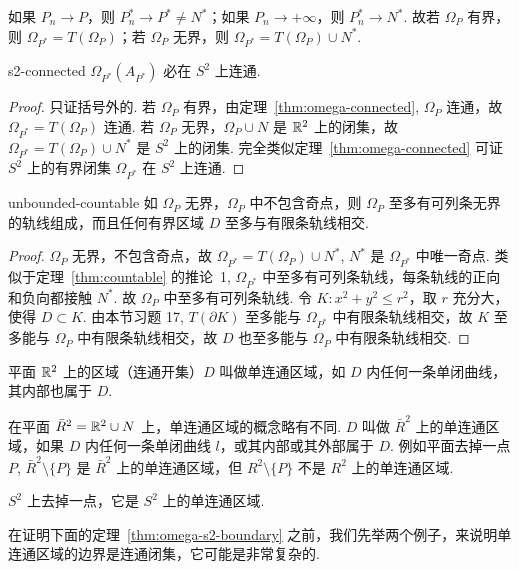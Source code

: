 如果 $P_n \to P$，则 $P_n^* \to P^* \neq N^*$；如果 $P_n \to +\infty$，则 $P_n^* \to N^*$. 故若 $\Omega_P$ 有界，则 $\Omega_{P^*} = T(\Omega_P)$；若 $\Omega_P$ 无界，则 $\Omega_{P^*} = T(\Omega_P) \cup N^*$.

\begin{theorem}{}{s2-connected}
$\Omega_{P^*}(A_{P^*})$ 必在 $S^2$ 上连通.
\end{theorem}

\begin{proof}
只证括号外的. 若 $\Omega_P$ 有界，由定理~\ref{thm:omega-connected}, $\Omega_P$ 连通，故 $\Omega_{P^*} = T(\Omega_P)$ 连通. 若 $\Omega_P$ 无界，$\Omega_P \cup N$ 是 $\mathbb{R}^2$ 上的闭集，故 $\Omega_{P^*} = T(\Omega_P) \cup N^*$ 是 $S^2$ 上的闭集. 完全类似定理~\ref{thm:omega-connected} 可证 $S^2$ 上的有界闭集 $\Omega_{P^*}$ 在 $S^2$ 上连通.
\end{proof}

\begin{theorem}{}{unbounded-countable}
如 $\Omega_P$ 无界，$\Omega_P$ 中不包含奇点，则 $\Omega_P$ 至多有可列条无界的轨线组成，而且任何有界区域 $D$ 至多与有限条轨线相交.
\end{theorem}

\begin{proof}
$\Omega_P$ 无界，不包含奇点，故 $\Omega_{P^*} = T(\Omega_P) \cup N^*$, $N^*$ 是 $\Omega_{P^*}$ 中唯一奇点. 类似于定理~\ref{thm:countable} 的推论~1, $\Omega_{P^*}$ 中至多有可列条轨线，每条轨线的正向和负向都接触 $N^*$. 故 $\Omega_P$ 中至多有可列条轨线. 令 $K: x^2 + y^2 \leq r^2$，取 $r$ 充分大，使得 $D \subset K$. 由本节习题 17, $T(\partial K)$ 至多能与 $\Omega_{P^*}$ 中有限条轨线相交，故 $K$ 至多能与 $\Omega_P$ 中有限条轨线相交，故 $D$ 也至多能与 $\Omega_P$ 中有限条轨线相交.
\end{proof}

平面 $\mathbb{R}^2$ 上的区域（连通开集）$D$ 叫做单连通区域，如 $D$ 内任何一条单闭曲线，其内部也属于 $D$.

在平面 $\bar R^2 = \mathbb{R}^2 \cup N$ 上，单连通区域的概念略有不同. $D$ 叫做 $\bar R^2$ 上的单连通区域，如果 $D$ 内任何一条单闭曲线 $l$，或其内部或其外部属于 $D$. 例如平面去掉一点 $P$, $\bar R^2 \setminus \{P\}$ 是 $\bar R^2$ 上的单连通区域，但 $R^2 \setminus \{P\}$ 不是 $R^2$ 上的单连通区域.

$S^2$ 上去掉一点，它是 $S^2$ 上的单连通区域.

在证明下面的定理~\ref{thm:omega-s2-boundary} 之前，我们先举两个例子，来说明单连通区域的边界是连通闭集，它可能是非常复杂的.

